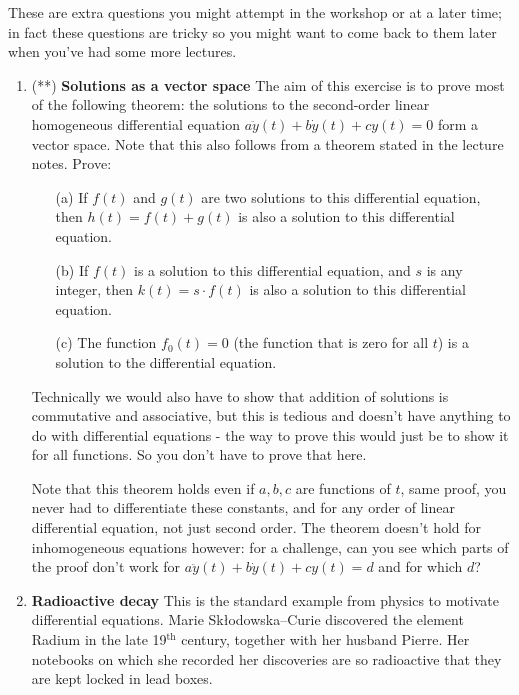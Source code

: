 \documentclass[11pt,a4paper]{scrartcl}
\begin{document}
These are extra questions you might attempt in the workshop or at a
later time; in fact these questions are tricky so you might want to
come back to them later when you've had some more lectures.

\begin{enumerate}

	
	\item (**) \textbf{Solutions as a vector space}	
	The aim of this exercise is to prove most of the following theorem:
	the solutions to the second-order linear homogeneous differential equation
	$a\ddot{y}(t) + b\dot{y}(t) + cy(t) = 0$ form a vector space. Note that this also follows from a theorem stated in the lecture notes. Prove:
	\begin{itemize}
		\item[(a)] If $f(t)$ and $g(t)$ are two solutions to this differential equation, then $h(t) = f(t) + g(t)$ is also a solution to this differential equation.
		\item[(b)] If $f(t)$ is a solution to this differential equation,
		and $s$ is any integer, then $k(t) = s \cdot f(t)$ is also a solution to this differential equation.
		\item[(c)] The function $f_0(t) = 0$ (the function that is zero for all $t$) is a solution to the differential equation.
	\end{itemize}
	Technically we would also have to show that addition of
        solutions is commutative and associative, but this is tedious
        and doesn't have anything to do with differential equations -
        the way to prove this would just be to show it for all
        functions. So you don't have to prove that here.
	
	Note that this theorem holds even if $a,b,c$ are functions of
        $t$, same proof, you never had to differentiate these
        constants, and for any order of linear differential equation,
        not just second order. The theorem doesn't hold for
        inhomogeneous equations however: for a challenge, can
        you see which parts of the proof don't work for $a\ddot{y}(t) +
        b\dot{y}(t) + cy(t) = d$ and for which $d$?
	
	\item \textbf{Radioactive decay}
	This is the standard example from physics to motivate differential equations.
	Marie Sk\l{}odowska–Curie discovered the element Radium in the late 19$^\text{th}$ century, together with her husband Pierre. Her notebooks on which she recorded her discoveries are so radioactive that they are kept locked in lead boxes.
	

\end{enumerate}
\end{document}
